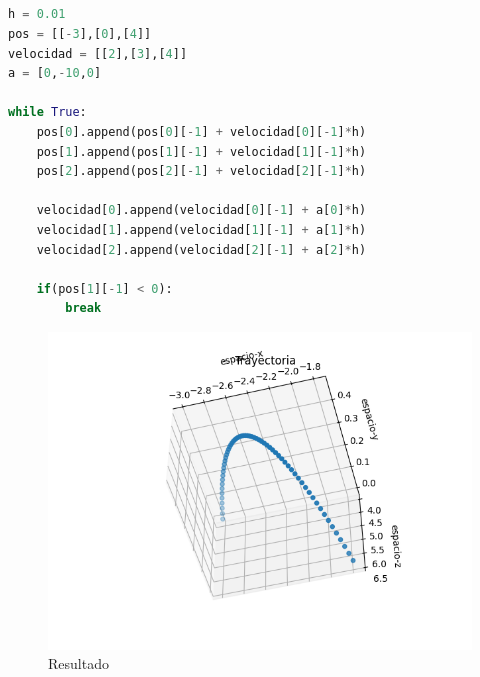 \documentclass{article}
\begin{document}
\subsection{}
\begin{lstlisting}[language=Python,caption=Desafío 1.1]
h = 0.01
pos = [[-3],[0],[4]]
velocidad = [[2],[3],[4]]
a = [0,-10,0]

while True:
    pos[0].append(pos[0][-1] + velocidad[0][-1]*h)
    pos[1].append(pos[1][-1] + velocidad[1][-1]*h)
    pos[2].append(pos[2][-1] + velocidad[2][-1]*h)

    velocidad[0].append(velocidad[0][-1] + a[0]*h)
    velocidad[1].append(velocidad[1][-1] + a[1]*h)
    velocidad[2].append(velocidad[2][-1] + a[2]*h)

    if(pos[1][-1] < 0):
        break
\end{lstlisting}
\begin{figure}[H]
    \centering
    \includegraphics[width=1.21\textwidth]{2_2.png}
    \caption{Resultado}
\end{figure}
\end{document}
